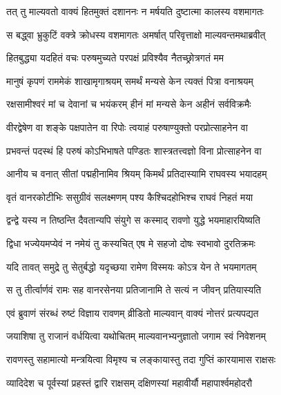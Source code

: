 
\twolineshloka
{तत् तु माल्यवतो वाक्यं हितमुक्तं दशाननः}
{न मर्षयति दुष्टात्मा कालस्य वशमागतः} %

\twolineshloka
{स बद्ध्वा भ्रुकुटिं वक्त्रे क्रोधस्य वशमागतः}
{अमर्षात् परिवृत्ताक्षो माल्यवन्तमथाब्रवीत्} %

\twolineshloka
{हितबुद्ध्या यदहितं वचः परुषमुच्यते}
{परपक्षं प्रविश्यैव नैतच्छ्रोत्रगतं मम} %

\twolineshloka
{मानुषं कृपणं राममेकं शाखामृगाश्रयम्}
{समर्थं मन्यसे केन त्यक्तं पित्रा वनाश्रयम्} %

\twolineshloka
{रक्षसामीश्वरं मां च देवानां च भयंकरम्}
{हीनं मां मन्यसे केन अहीनं सर्वविक्रमैः} %

\twolineshloka
{वीरद्वेषेण वा शङ्के पक्षपातेन वा रिपोः}
{त्वयाहं परुषाण्युक्तो परप्रोत्साहनेन वा} %

\twolineshloka
{प्रभवन्तं पदस्थं हि परुषं कोऽभिभाषते}
{पण्डितः शास्त्रतत्त्वज्ञो विना प्रोत्साहनेन वा} %

\twolineshloka
{आनीय च वनात् सीतां पद्महीनामिव श्रियम्}
{किमर्थं प्रतिदास्यामि राघवस्य भयादहम्} %

\twolineshloka
{वृतं वानरकोटीभिः ससुग्रीवं सलक्ष्मणम्}
{पश्य कैश्चिदहोभिश्च राघवं निहतं मया} %

\twolineshloka
{द्वन्द्वे यस्य न तिष्ठन्ति दैवतान्यपि संयुगे}
{स कस्माद् रावणो युद्धे भयमाहारयिष्यति} %

\twolineshloka
{द्विधा भज्येयमप्येवं न नमेयं तु कस्यचित्}
{एष मे सहजो दोषः स्वभावो दुरतिक्रमः} %

\twolineshloka
{यदि तावत् समुद्रे तु सेतुर्बद्धो यदृच्छया}
{रामेण विस्मयः कोऽत्र येन ते भयमागतम्} %

\twolineshloka
{स तु तीर्त्वार्णवं रामः सह वानरसेनया}
{प्रतिजानामि ते सत्यं न जीवन् प्रतियास्यति} %

\twolineshloka
{एवं ब्रुवाणं संरब्धं रुष्टं विज्ञाय रावणम्}
{व्रीडितो माल्यवान् वाक्यं नोत्तरं प्रत्यपद्यत} %

\twolineshloka
{जयाशिषा तु राजानं वर्धयित्वा यथोचितम्}
{माल्यवानभ्यनुज्ञातो जगाम स्वं निवेशनम्} %

\twolineshloka
{रावणस्तु सहामात्यो मन्त्रयित्वा विमृश्य च}
{लङ्कायास्तु तदा गुप्तिं कारयामास राक्षसः} %

\twolineshloka
{व्यादिदेश च पूर्वस्यां प्रहस्तं द्वारि राक्षसम्}
{दक्षिणस्यां महावीर्यौ महापार्श्वमहोदरौ} %

